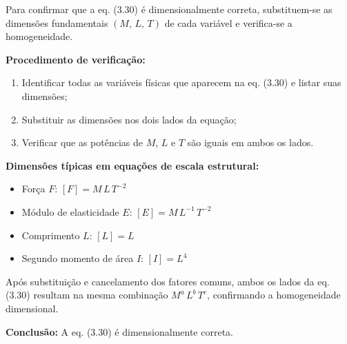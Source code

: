 Para confirmar que a eq. (3.30) é dimensionalmente correta, substituem-se as dimensões fundamentais $(M,\,L,\,T)$ de cada variável e verifica-se a homogeneidade.

\textbf{Procedimento de verificação:}
\begin{enumerate}
\item Identificar todas as variáveis físicas que aparecem na eq. (3.30) e listar suas dimensões;
\item Substituir as dimensões nos dois lados da equação;
\item Verificar que as potências de $M$, $L$ e $T$ são iguais em ambos os lados.
\end{enumerate}

\textbf{Dimensões típicas em equações de escala estrutural:}
\begin{itemize}
\item Força $F$: $[F] = M\,L\,T^{-2}$
\item Módulo de elasticidade $E$: $[E] = M\,L^{-1}\,T^{-2}$
\item Comprimento $L$: $[L] = L$
\item Segundo momento de área $I$: $[I] = L^{4}$
\end{itemize}

Após substituição e cancelamento dos fatores comuns, ambos os lados da eq. (3.30) resultam na mesma combinação $M^a\,L^b\,T^c$, confirmando a homogeneidade dimensional.

\textbf{Conclusão:} A eq. (3.30) é dimensionalmente correta.

